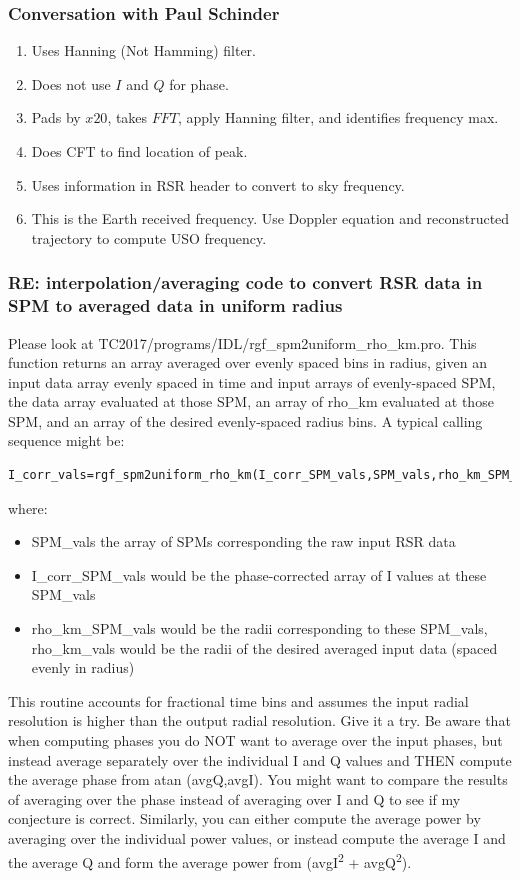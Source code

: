\documentclass[crop=false,class=article,oneside]{standalone}
\begin{document}
        \subsubsection{Conversation with Paul Schinder}
            \begin{enumerate}
                \item Uses Hanning (Not Hamming) filter.
                \item Does not use $I$ and $Q$ for phase.
                \item Pads by $x20$, takes $FFT$, apply Hanning filter,
                      and identifies frequency max.
                \item Does CFT to find location of peak.
                \item Uses information in RSR header to convert
                      to sky frequency.
                \item This is the Earth received frequency.
                      Use Doppler equation and reconstructed trajectory
                      to compute USO frequency.
            \end{enumerate}
\subsubsection{\footnotesize RE: interpolation/averaging code to convert RSR data in SPM to averaged data in uniform radius}
Please look at TC2017/programs/IDL/rgf\_spm2uniform\_rho\_km.pro. This function returns an array averaged over evenly spaced bins in radius, given an input data array evenly spaced in time and input arrays of evenly-spaced SPM, the data array evaluated at those SPM, an array of rho\_km evaluated at those SPM, and an array of the desired evenly-spaced radius bins. A typical calling sequence might be:
\begin{lstlisting}[language=IDL]
I_corr_vals=rgf_spm2uniform_rho_km(I_corr_SPM_vals,SPM_vals,rho_km_SPM_vals,rho_km_vals)
\end{lstlisting}
where:
\begin{itemize}
    \item SPM\_vals the array of SPMs corresponding the raw input RSR data
    \item I\_corr\_SPM\_vals would be the phase-corrected array of I values at these SPM\_vals
    \item rho\_km\_SPM\_vals would be the radii corresponding to these SPM\_vals,
    rho\_km\_vals would be the radii of the desired averaged input data (spaced evenly in radius)
\end{itemize}
This routine accounts for fractional time bins and assumes the input radial resolution is higher than the output radial resolution. Give it a try. Be aware that when computing phases you do NOT want to average over the input phases, but instead average separately over the individual I and Q values  and THEN compute the average phase from atan (avgQ,avgI). You might want to compare the results of averaging over the phase instead of averaging over I and Q to see if my conjecture is correct. Similarly, you can either compute the average power by averaging over the individual power values, or instead compute the average I and the average Q and form the average power from (avgI\textsuperscript{2} + avgQ\textsuperscript{2}).
\end{document}
